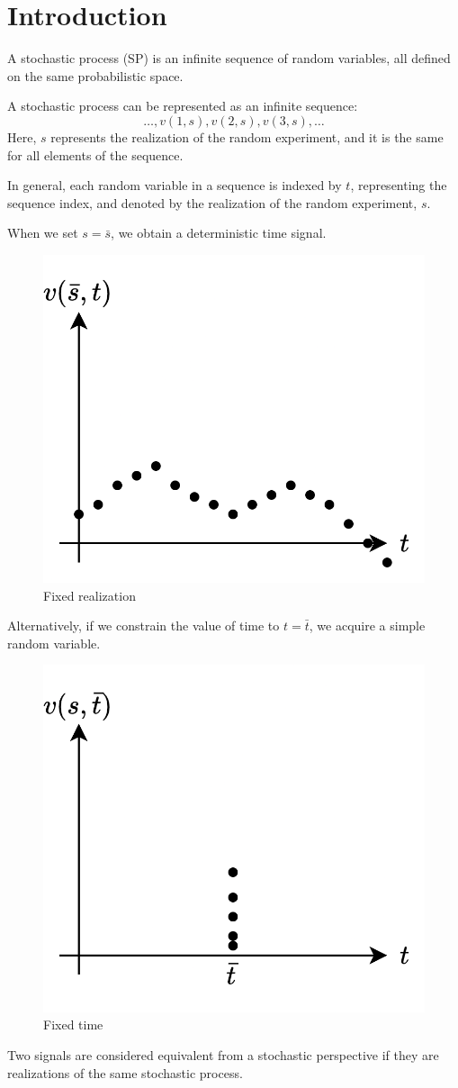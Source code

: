 \section{Introduction} 

\begin{definition}
    A stochastic process (SP) is an infinite sequence of random variables, all defined on the same probabilistic space.
\end{definition}
A stochastic process can be represented as an infinite sequence:
\[\dots,v(1,s),v(2,s),v(3,s),\dots\]
Here, $s$ represents the realization of the random experiment, and it is the same for all elements of the sequence.

In general, each random variable in a sequence is indexed by $t$, representing the sequence index, and denoted by the realization of the random experiment, $s$.

When we set $s=\bar{s}$, we obtain a deterministic time signal. 
\begin{figure}[H]
    \centering
    \includegraphics[width=0.35\linewidth]{images/outcome.png}
    \caption{Fixed realization}
\end{figure}
Alternatively, if we constrain the value of time to $t=\bar{t}$, we acquire a simple random variable. 
\begin{figure}[H]
    \centering
    \includegraphics[width=0.35\linewidth]{images/time.png}
    \caption{Fixed time}
\end{figure}

\begin{definition}
    Two signals are considered equivalent from a stochastic perspective if they are realizations of the same stochastic process.
\end{definition}

